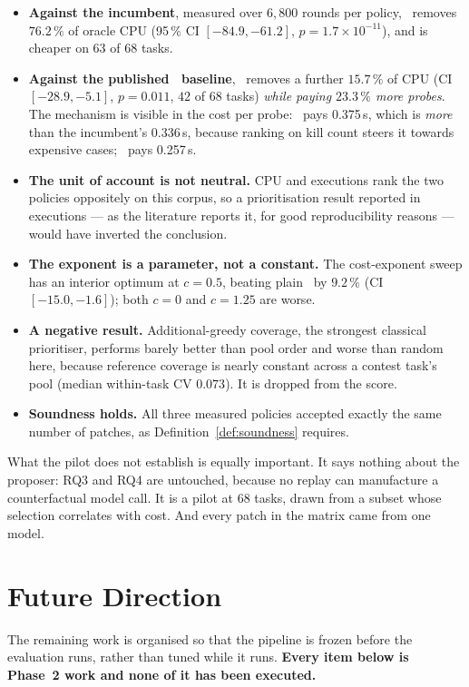 \begin{itemize}[leftmargin=*,itemsep=3pt]
\item \textbf{Against the incumbent}, measured over $6{,}800$ rounds per
policy, \km\ removes $76.2\,\%$ of oracle CPU (95\,\% CI $[-84.9, -61.2]$,
$p = 1.7\times10^{-11}$), and is cheaper on $63$ of $68$ tasks.
\item \textbf{Against the published \frtp\ baseline}, \km\ removes a further
$15.7\,\%$ of CPU (CI $[-28.9, -5.1]$, $p = 0.011$, $42$ of $68$ tasks)
\emph{while paying $23.3\,\%$ more probes}. The mechanism is visible in the
cost per probe: \frtp\ pays 0.375\,s, which is \emph{more} than the
incumbent's 0.336\,s, because ranking on kill count steers it
towards expensive cases; \km\ pays 0.257\,s.
\item \textbf{The unit of account is not neutral.} CPU and executions rank the
two policies oppositely on this corpus, so a prioritisation result reported in
executions --- as the literature reports it, for good reproducibility
reasons --- would have inverted the conclusion.
\item \textbf{The exponent is a parameter, not a constant.} The cost-exponent
sweep has an interior optimum at $c = 0.5$, beating plain \km\ by $9.2\,\%$
(CI $[-15.0,-1.6]$); both $c{=}0$ and $c{=}1.25$ are worse.
\item \textbf{A negative result.} Additional-greedy coverage, the strongest
classical prioritiser, performs barely better than pool order and worse than
random here, because reference coverage is nearly constant across a contest
task's pool (median within-task CV $0.073$). It is dropped from the score.
\item \textbf{Soundness holds.} All three measured policies accepted exactly
the same number of patches, as Definition~\ref{def:soundness} requires.
\end{itemize}

What the pilot does not establish is equally important. It says nothing about
the proposer: RQ3 and RQ4 are untouched, because no replay can manufacture a
counterfactual model call. It is a pilot at $68$ tasks, drawn from a subset
whose selection correlates with cost. And every patch in the matrix came from
one model.

\section{Future Direction}
\label{sec:future}

The remaining work is organised so that the pipeline is frozen before the
evaluation runs, rather than tuned while it runs. \textbf{Every item below is
Phase~2 work and none of it has been executed.}

